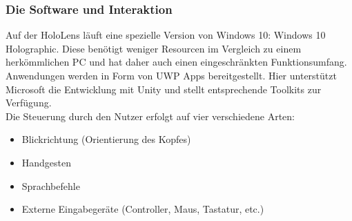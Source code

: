 \subsubsection{Die Software und Interaktion}
Auf der HoloLens läuft eine spezielle Version von Windows 10: Windows 10 Holographic. Diese benötigt weniger Resourcen im Vergleich zu einem herkömmlichen PC und hat daher auch einen eingeschränkten Funktionsumfang. Anwendungen werden in Form von UWP Apps bereitgestellt. Hier unterstützt Microsoft die Entwicklung mit Unity und stellt entsprechende Toolkits zur Verfügung.\\

Die Steuerung durch den Nutzer erfolgt auf vier verschiedene Arten:
\begin{itemize}[topsep=-2px]
	\setlength{\itemsep}{-5pt}
	\item Blickrichtung (Orientierung des Kopfes)
	\item Handgesten
	\item Sprachbefehle
	\item Externe Eingabegeräte (Controller, Maus, Tastatur, etc.)
\end{itemize}


